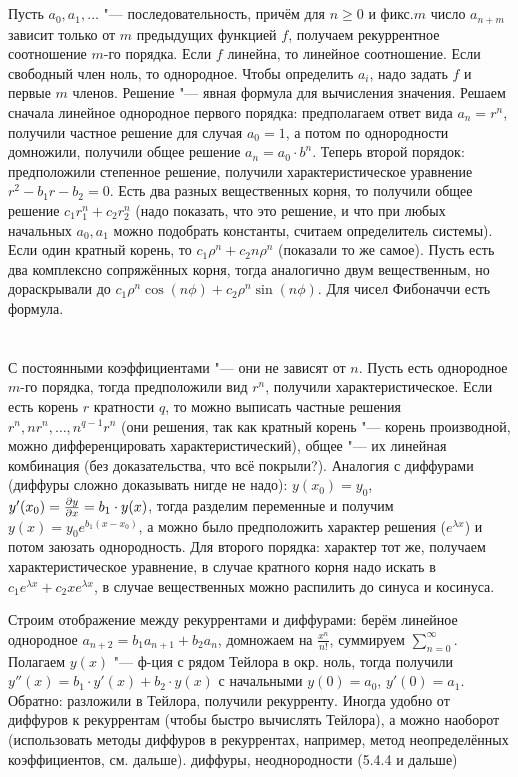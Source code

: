 \section{} %
Пусть $a_0, a_1, \dots$ "--- последовательность, причём для $n\ge 0$ и фикс.$m$
число $a_{n+m}$ зависит только от $m$ предыдущих функцией $f$, получаем рекуррентное соотношение $m$-го порядка.
Если $f$ линейна, то линейное соотношение.
Если свободный член ноль, то однородное.
Чтобы определить $a_i$, надо задать $f$ и первые $m$ членов.
Решение "--- явная формула для вычисления значения.
Решаем сначала линейное однородное первого порядка: предполагаем ответ вида $a_n=r^n$, получили частное решение
для случая $a_0=1$, а потом по однородности домножили, получили общее решение $a_n=a_0\cdot b^n$.
Теперь второй порядок: предположили степенное решение, получили характеристическое уравнение $r^2-b_1r-b_2=0$.
Есть два разных вещественных корня, то получили общее решение $c_1r_1^n+c_2r_2^n$ (надо показать, что это решение,
и что при любых начальных $a_0, a_1$ можно подобрать константы, считаем определитель системы).
Если один кратный корень, то $c_1\rho^n+c_2n\rho^n$ (показали то же самое).
Пусть есть два комплексно сопряжённых корня, тогда аналогично двум вещественным, но дораскрывали до
$c_1 \rho^n \cos (n \phi) + c_2\rho^n \sin(n \phi)$.
Для чисел Фибоначчи есть формула.

\section{} %
С постоянными коэффициентами "--- они не зависят от $n$.
Пусть есть однородное $m$-го порядка, тогда предположили вид $r^n$, получили характеристическое.
Если есть корень $r$ кратности $q$, то можно выписать частные решения $r^n, nr^n, \dots, n^{q-1}r^n$ (они решения,
так как кратный корень "--- корень производной, можно дифференцировать характеристический),
общее "--- их линейная комбинация (без доказательства, что всё покрыли?).
Аналогия с диффурами (диффуры сложно доказывать нигде не надо): $y(x_0)=y_0$, $y'(x_0)=\frac{\partial y}{\partial x}=b_1\cdot y(x)$, тогда разделим переменные и получим
$y(x)=y_0e^{b_1(x-x_0)}$, а можно было предположить характер решения ($e^{\lambda x}$) и потом заюзать однородность.
Для второго порядка: характер тот же, получаем характеристическое уравнение, в случае кратного корня
надо искать в $c_1e^{\lambda x}+c_2xe^{\lambda x}$, в случае вещественных можно распилить до синуса и косинуса.

Строим отображение между рекуррентами и диффурами: берём линейное однородное $a_{n+2}=b_1a_{n+1}+b_2a_n$,
домножаем на $\frac{x^n}{n!}$, суммируем $\sum_{n=0}^\infty$.
Полагаем $y(x)$ "--- ф-ция с рядом Тейлора в окр. ноль, тогда получили $y''(x)=b_1\cdot y'(x) + b_2 \cdot y(x)$
с начальными $y(0)=a_0$, $y'(0)=a_1$.
Обратно: разложили в Тейлора, получили рекурренту.
Иногда удобно от диффуров к рекуррентам (чтобы быстро вычислять Тейлора), а можно наоборот (использовать методы диффуров в рекуррентах,
например, метод неопределённых коэффициентов, см. дальше).
\TODO диффуры, неоднородности (5.4.4 и дальше)

